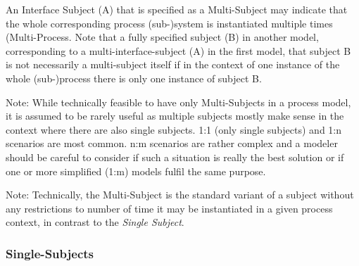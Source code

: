  


An Interface Subject (A) that is specified as a Multi-Subject may indicate that the whole corresponding process (sub-)system is instantiated multiple times (Multi-Process. Note that a fully specified subject (B) in another model, corresponding to a multi-interface-subject (A) in the first model, that  subject B is not necessarily a multi-subject itself if in the context of one instance of the whole (sub-)process there is only one instance of subject B. 

Note: While technically feasible to have only Multi-Subjects in a process model, it is assumed to be rarely useful as multiple subjects mostly make sense in the context where there are also single subjects. 1:1 (only single subjects) and 1:n scenarios are most common. n:m scenarios are rather complex and a modeler should be careful to consider if such a situation is really the best solution or if one or more simplified (1:m) models fulfil the same purpose.

Note: Technically, the Multi-Subject is the standard variant of a subject without any restrictions to number of time it may be instantiated in a given process context, in contrast to the \textit{Single Subject}.

\subsubsection{Single-Subjects}
\label{sec:singleSubjects}

